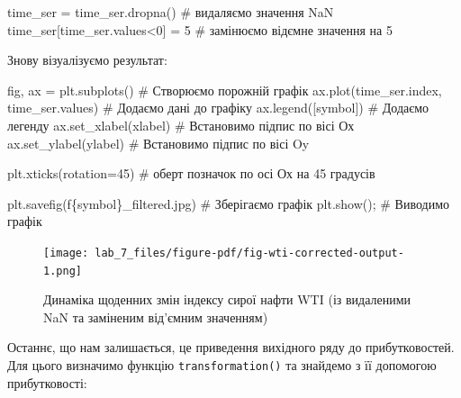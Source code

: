 \documentclass[
  letterpaper,
]{report}
\newenvironment{Shaded}{\begin{snugshade}}{\end{snugshade}}
\newcommand{\CommentTok}[1]{\textcolor[rgb]{0.37,0.37,0.37}{#1}}
\newcommand{\DecValTok}[1]{\textcolor[rgb]{0.68,0.00,0.00}{#1}}
\newcommand{\NormalTok}[1]{\textcolor[rgb]{0.00,0.23,0.31}{#1}}
\newcommand{\OperatorTok}[1]{\textcolor[rgb]{0.37,0.37,0.37}{#1}}
\newcommand{\SpecialCharTok}[1]{\textcolor[rgb]{0.37,0.37,0.37}{#1}}
\newcommand{\SpecialStringTok}[1]{\textcolor[rgb]{0.13,0.47,0.30}{#1}}
\begin{document}
\begin{Shaded}
\begin{Highlighting}[]
\NormalTok{time\_ser }\OperatorTok{=}\NormalTok{ time\_ser.dropna()    }\CommentTok{\# видаляємо значення NaN}
\NormalTok{time\_ser[time\_ser.values}\OperatorTok{\textless{}}\DecValTok{0}\NormalTok{] }\OperatorTok{=} \DecValTok{5} \CommentTok{\# замінюємо від\textquotesingle{}ємне значення на 5}
\end{Highlighting}
\end{Shaded}

Знову візуалізуємо результат:

\begin{Shaded}
\begin{Highlighting}[]
\NormalTok{fig, ax }\OperatorTok{=}\NormalTok{ plt.subplots()                   }\CommentTok{\# Створюємо порожній графік}
\NormalTok{ax.plot(time\_ser.index, time\_ser.values)   }\CommentTok{\# Додаємо дані до графіку}
\NormalTok{ax.legend([symbol])                        }\CommentTok{\# Додаємо легенду}
\NormalTok{ax.set\_xlabel(xlabel)                      }\CommentTok{\# Встановимо підпис по вісі Ох}
\NormalTok{ax.set\_ylabel(ylabel)                      }\CommentTok{\# Встановимо підпис по вісі Oy}

\NormalTok{plt.xticks(rotation}\OperatorTok{=}\DecValTok{45}\NormalTok{)                    }\CommentTok{\# оберт позначок по осі Ох на 45 градусів}

\NormalTok{plt.savefig(}\SpecialStringTok{f\textquotesingle{}}\SpecialCharTok{\{}\NormalTok{symbol}\SpecialCharTok{\}}\SpecialStringTok{\_filtered.jpg\textquotesingle{}}\NormalTok{)      }\CommentTok{\# Зберігаємо графік }
\NormalTok{plt.show()}\OperatorTok{;}                                \CommentTok{\# Виводимо графік}
\end{Highlighting}
\end{Shaded}

\begin{figure}[H]

{\centering \texttt{[image: lab\_7\_files/figure-pdf/fig-wti-corrected-output-1.png]}

}

\caption{\label{fig-wti-corrected}Динаміка щоденних змін індексу сирої
нафти WTI (із видаленими NaN та заміненим від'ємним значенням)}

\end{figure}

Останнє, що нам залишається, це приведення вихідного ряду до
прибутковостей. Для цього визначимо функцію \texttt{transformation()} та
знайдемо з її допомогою прибутковості:
\end{document}
